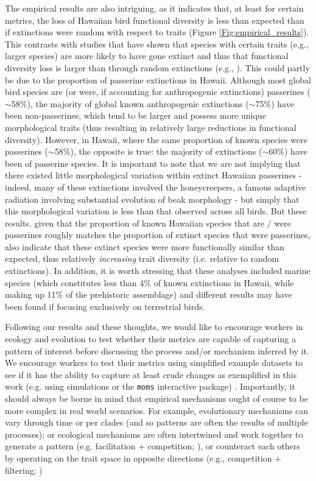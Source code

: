 \documentclass[12pt,letterpaper]{article}
\begin{document}
The empirical results are also intriguing, as it indicates that, at least for certain metrics, the loss of Hawaiian bird functional diversity is less than expected than if extinctions were random with respect to traits (Figure \ref{Fig:empirical_results}).
This contrasts with studies that have shown that species with certain traits (e.g., larger species) are more likely to have gone extinct and thus that functional diversity loss is larger than through random extinctions (e.g., \citealt{sayol2021loss,Matthews2022}).
This could partly be due to the proportion of passerine extinctions in Hawaii.
Although most global bird species are (or were, if accounting for anthropogenic extinctions) passerines ($\sim$58\%), the majority of global known anthropogenic extinctions ($\sim$75\%) have been non-passerines, which tend to be larger and possess more unique morphological traits (thus resulting in relatively large reductions in functional diversity).
However, in Hawaii, where the same proportion of known species were passerines ($\sim$58\%), the opposite is true: the majority of extinctions ($\sim$60\%) have been of passerine species.
It is important to note that we are not implying that there existed little morphological variation within extinct Hawaiian passerines - indeed, many of these extinctions involved the honeycreepers, a famous adaptive radiation involving substantial evolution of beak morphology \citep{Walther2022} - but simply that this morphological variation is less than that observed across all birds.
But these results, given that the proportion of known Hawaiian species that are / were passerines roughly matches the proportion of extinct species that were passerines,  also indicate that these extinct species were more functionally similar than expected, thus relatively \textit{increasing} trait diversity (i.e.
relative to random extinctions).
In addition, it is worth stressing that these analyses included marine species (which constitutes less than 4\% of  known extinctions in Hawaii, while making up 11\% of the prehistoric assemblage) and different results may have been found if focusing exclusively on terrestrial birds.


Following our results and these thoughts, we would like to encourage workers in ecology and evolution to test whether their metrics are capable of capturing a pattern of interest before discussing the process and/or mechanism inferred by it.
We encourage workers to test their metrics using simplified example datasets to see if it has the ability to capture at least crude changes as exemplified in this work (e.g. using simulations \citealt{guillerme2024treats} or the \texttt{moms} interactive package) \citealt{guillerme2020shifting}.
Importantly, it should always be borne in mind that empirical mechanisms ought of course to be more complex in real world scenarios.
For example, evolutionary mechanisms can vary through time or per clades (and so patterns are often the results of multiple processes); or ecological mechanisms are often intertwined and work together to generate a pattern (e.g. facilitation + competition; \citealt{danet2024species}), or counteract each others by operating on the trait space in opposite directions (e.g., competition + filtering; \citealt{mammola2024functional})
\end{document}
